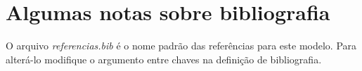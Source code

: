 \documentclass[oneside,openright,12pt]{ufsm_2015} %
\author{Seu Nome}   %
\begin{document}
\pretextual  %









%
\geraintro  %

\chapter{Algumas notas sobre bibliografia}


\par O arquivo \textit{referencias.bib} é o nome padrão das referências para este modelo. Para alterá-lo modifique o argumento entre chaves na definição de bibliografia.
\end{document}
